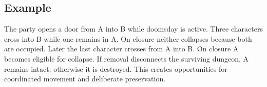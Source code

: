 \subsection{Example}

The party opens a door from A into B while doomsday is active. Three characters cross into B while one remains in A. On closure neither collapses because both are occupied. Later the last character crosses from A into B. On closure A becomes eligible for collapse. If removal disconnects the surviving dungeon, A remains intact; otherwise it is destroyed. This creates opportunities for coordinated movement and deliberate preservation.
